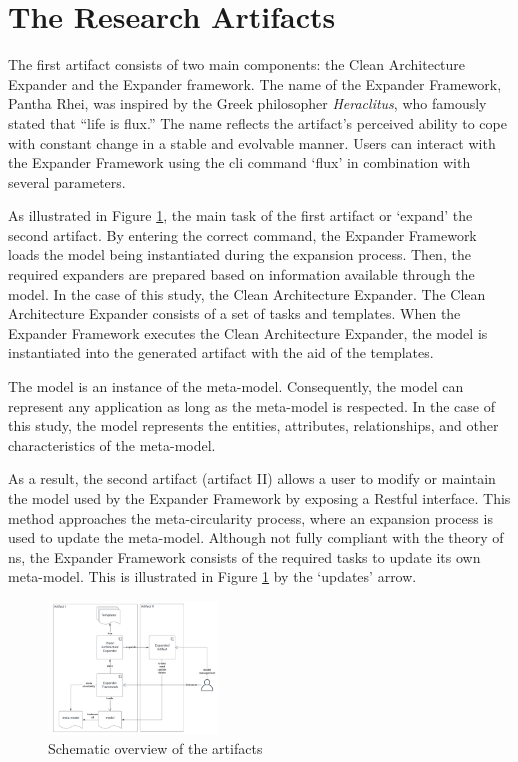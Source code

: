 \section{The Research Artifacts}

The first artifact consists of two main components: the Clean Architecture Expander and
the Expander framework. The name of the Expander Framework, Pantha Rhei, was inspired by
the Greek philosopher \emph{Heraclitus}, who famously stated that \enquote{life is flux.}
The name reflects the artifact's perceived ability to cope with constant change in a
stable and evolvable manner. Users can interact with the Expander Framework using the
\gls{cli} command \enquote*{flux} in combination with several parameters.

As illustrated in Figure \ref{fig_overview_design}, the main task of the first artifact or
\enquote*{expand} the second artifact. By entering the correct command, the Expander
Framework loads the model being instantiated during the expansion process. Then, the
required expanders are prepared based on information available through the model. In the
case of this study, the Clean Architecture Expander. The Clean Architecture Expander
consists of a set of tasks and templates. When the Expander Framework executes the Clean
Architecture Expander, the model is instantiated into the generated artifact with the aid
of the templates.

The model is an instance of the meta-model. Consequently, the model can represent any
application as long as the meta-model is respected. In the case of this study, the model
represents the entities, attributes, relationships, and other characteristics of the
meta-model.

As a result, the second artifact (artifact II) allows a user to modify or maintain the
model used by the Expander Framework by exposing a Restful interface. This method
approaches the meta-circularity process, where an expansion process is used to update the
meta-model. Although not fully compliant with the theory of \gls{ns}, the Expander
Framework consists of the required tasks to update its own meta-model. This is illustrated
in Figure \ref{fig_overview_design} by the \enquote*{updates} arrow.

\begin{figure}[htbp]
    \centering
    \includegraphics[width=0.4\textwidth]{figures/artifactOverview.pdf}
    \caption[Schematic overview of the artifacts]{Schematic overview of the artifacts}
    \label{fig_overview_design}
  \end{figure}






